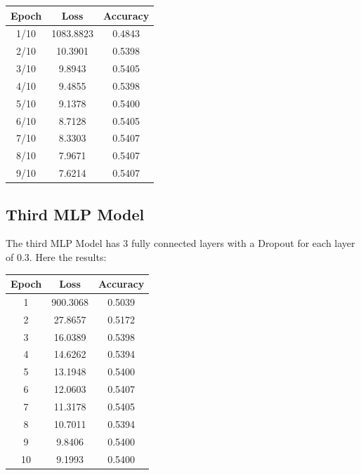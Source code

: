 \begin{center}
\begin{tabular}{|c|c|c|}
\hline
\textbf{Epoch} & \textbf{Loss} & \textbf{Accuracy} \\
\hline
1/10 & 1083.8823 & 0.4843 \\
\hline
2/10 & 10.3901 & 0.5398 \\
\hline
3/10 & 9.8943 & 0.5405 \\
\hline
4/10 & 9.4855 & 0.5398 \\
\hline
5/10 & 9.1378 & 0.5400 \\
\hline
6/10 & 8.7128 & 0.5405 \\
\hline
7/10 & 8.3303 & 0.5407 \\
\hline
8/10 & 7.9671 & 0.5407 \\
\hline
9/10 & 7.6214 & 0.5407 \\
\hline
\end{tabular}
\end{center}
\subsection{Third MLP Model}
The third MLP Model has 3 fully connected layers with a Dropout for each layer of 0.3. Here the results:
\begin{center}
\begin{tabular}{|c|c|c|}
\hline
Epoch & Loss & Accuracy \\
\hline
1 & 900.3068 & 0.5039 \\
\hline
2 & 27.8657 & 0.5172 \\
\hline
3 & 16.0389 & 0.5398 \\
\hline
4 & 14.6262 & 0.5394 \\
\hline
5 & 13.1948 & 0.5400 \\
\hline
6 & 12.0603 & 0.5407 \\
\hline
7 & 11.3178 & 0.5405 \\
\hline
8 & 10.7011 & 0.5394 \\
\hline
9 & 9.8406 & 0.5400 \\
\hline
10 & 9.1993 & 0.5400 \\
\hline
\end{tabular}
\end{center}
